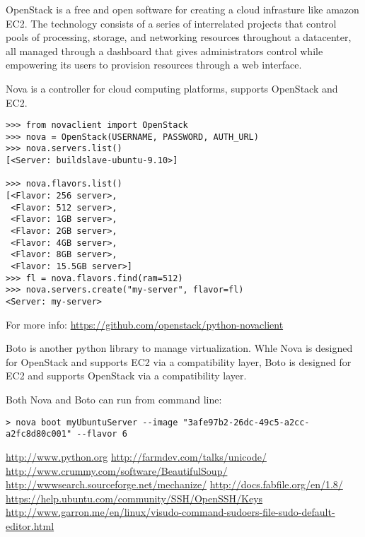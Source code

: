\documentclass[justified,sixbynine]{tufte-book}
\theoremstyle{plain}%
\theoremstyle{definition}
\theoremstyle{remark}
\begin{document}
\begin{fullwidth}
OpenStack is a free and open software for creating a cloud infrasture like amazon EC2.
The technology consists of a series of interrelated projects that control pools of processing, storage, and networking resources throughout a datacenter, all managed through a dashboard that gives administrators control while empowering its users to provision resources through a web interface.

Nova is a controller for cloud computing platforms, supports OpenStack and EC2.

\begin{verbatim}
>>> from novaclient import OpenStack
>>> nova = OpenStack(USERNAME, PASSWORD, AUTH_URL)
>>> nova.servers.list()
[<Server: buildslave-ubuntu-9.10>]

>>> nova.flavors.list()
[<Flavor: 256 server>,
 <Flavor: 512 server>,
 <Flavor: 1GB server>,
 <Flavor: 2GB server>,
 <Flavor: 4GB server>,
 <Flavor: 8GB server>,
 <Flavor: 15.5GB server>]
>>> fl = nova.flavors.find(ram=512)
>>> nova.servers.create("my-server", flavor=fl)
<Server: my-server>
\end{verbatim}

For more info:
\url{https://github.com/openstack/python-novaclient}

Boto is another python library to manage virtualization. Whle Nova is designed for OpenStack and supports EC2 via a compatibility layer, Boto is designed for EC2 and supports OpenStack via a compatibility layer.

Both Nova and Boto can run from command line:

\begin{verbatim}
> nova boot myUbuntuServer --image "3afe97b2-26dc-49c5-a2cc-a2fc8d80c001" --flavor 6
\end{verbatim}

\end{fullwidth}
\backmatter

\printindex

\begin{thebibliography}{999}
 \url{http://www.python.org}
 \url{http://farmdev.com/talks/unicode/}
 \url{http://www.crummy.com/software/BeautifulSoup/}
 \url{http://wwwsearch.sourceforge.net/mechanize/}
 \url{http://docs.fabfile.org/en/1.8/}
 \url{https://help.ubuntu.com/community/SSH/OpenSSH/Keys}
 \url{http://www.garron.me/en/linux/visudo-command-sudoers-file-sudo-default-editor.html}
\end{thebibliography}
\end{document}
